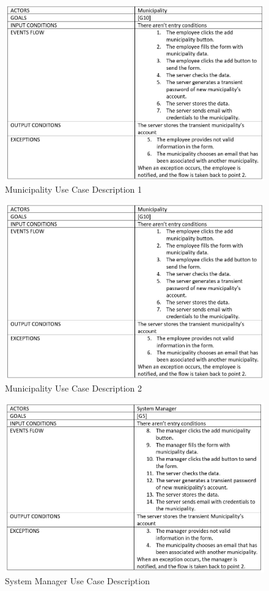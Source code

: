 \begin{figure}[h]
\centering
\includegraphics[width=\textwidth]{Images/Municipality_use_case2.png}
\caption{\label{fig:MUCD}Municipality Use Case  Description 1}
\end{figure}
\begin{figure}[h]
\centering
\includegraphics[width=\textwidth]{Images/Municipality_use_case2.png}
\caption{\label{fig:MUCD2}Municipality Use Case  Description 2}
\end{figure}
\begin{figure}[h]
\centering
\includegraphics[width=\textwidth]{Images/system_manager_use_case.png}
\caption{\label{fig:SMUCD}System Manager Use Case  Description}
\end{figure}
